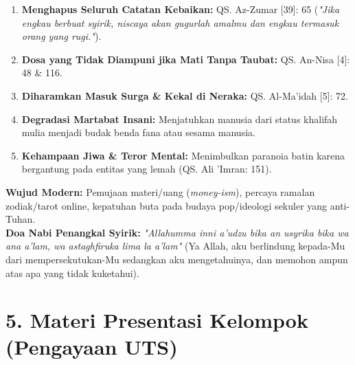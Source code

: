 \documentclass[10pt,a4paper]{article}
\begin{document}
\begin{dalilbox}
\begin{enumerate}
  \item \textbf{Menghapus Seluruh Catatan Kebaikan:} QS. Az-Zumar [39]: 65 (\textit{"Jika engkau berbuat syirik, niscaya akan gugurlah amalmu dan engkau termasuk orang yang rugi."}).
  \item \textbf{Dosa yang Tidak Diampuni jika Mati Tanpa Taubat:} QS. An-Nisa [4]: 48 \& 116.
  \item \textbf{Diharamkan Masuk Surga \& Kekal di Neraka:} QS. Al-Ma'idah [5]: 72.
  \item \textbf{Degradasi Martabat Insani:} Menjatuhkan manusia dari status khalifah mulia menjadi budak benda fana atau sesama manusia.
  \item \textbf{Kehampaan Jiwa \& Teror Mental:} Menimbulkan paranoia batin karena bergantung pada entitas yang lemah (QS. Ali 'Imran: 151).
\end{enumerate}
\end{dalilbox}

\begin{conceptbox}
\textbf{Wujud Modern:} Pemujaan materi/uang (\textit{money-ism}), percaya ramalan zodiak/tarot online, kepatuhan buta pada budaya pop/ideologi sekuler yang anti-Tuhan. \\
\textbf{Doa Nabi Penangkal Syirik:} \textit{"Allahumma inni a'udzu bika an usyrika bika wa ana a'lam, wa astaghfiruka lima la a'lam"} (Ya Allah, aku berlindung kepada-Mu dari mempersekutukan-Mu sedangkan aku mengetahuinya, dan memohon ampun atas apa yang tidak kuketahui).
\end{conceptbox}

\section*{\color{ugmblue}\Large 5. Materi Presentasi Kelompok (Pengayaan UTS)}
\end{document}
